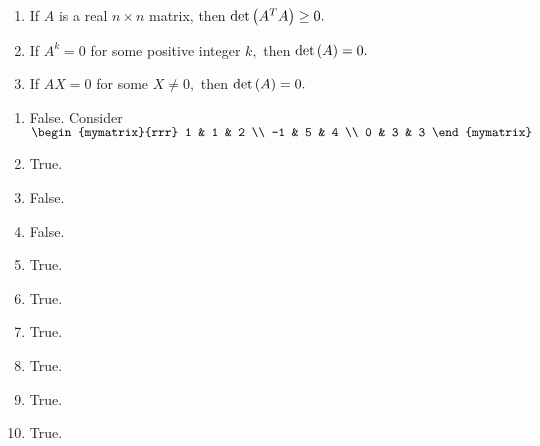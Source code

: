 \begin{enumialphparenastyle}
\begin{ex}
\begin{enumerate}
\item If $A$ is a real $n\times n$ matrix, then $\det \left(A^{T}A\right)
\geq 0.$

\item If $A^{k}=0$ for some positive integer $k,$ then $\det \left(
A\right) =0.$

\item If $AX=0$ for some $X \neq 0,$ then $\det \left(
A\right) =0.$
\end{enumerate}
\begin{sol}
\begin{enumerate}
\item False. Consider $\begin{mymatrix}{rrr}
1 & 1 & 2 \\
-1 & 5 & 4 \\
0 & 3 & 3
\end{mymatrix} $
\item True.
\item False.
\item False.
\item True.
\item True.
\item True.
\item True.
\item True.
\item True.
\end{enumerate}
\end{sol}
\end{ex}

\end{enumialphparenastyle}